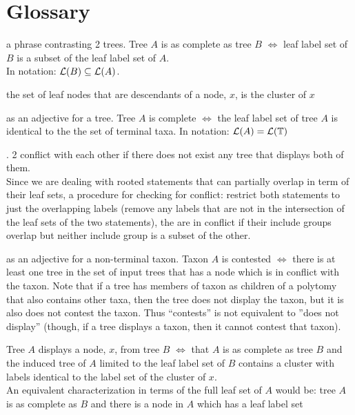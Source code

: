 \newcommand{\defitem}[2]{\item[{\bf #1}]\label{itm:#2} }
\newcommand{\notitem}[1]{\item[]#1}
\section{Glossary}
\begin{compactenum}
\defitem{as complete}{defAsComplete} a phrase contrasting 2 trees.
    Tree $A$ is as complete as tree $B$ $\iff$
    leaf label set of $B$ is a subset of the leaf label set of $A$.\\
    In notation: $\mathcal{L}(B) \subseteq \mathcal{L}(A)$.
\defitem{cluster}{defCluster} the set of leaf nodes that are descendants
    of a node, $x$, is the cluster of $x$
\defitem{complete}{defComplete} as an adjective for a tree. Tree $A$ is complete $\iff$ the leaf label set
    of tree $A$ is identical to the the set of terminal taxa.
    In notation: $\mathcal{L}(A) = \mathcal{L}(\mathbb{T})$
\defitem{conflicting}{defConflicting}. 2 \pss conflict with each other if there does not exist
    any tree that displays both of them.\\
    Since we are dealing with rooted statements that can partially overlap in term of their leaf sets, 
    a procedure for checking for conflict: restrict both statements to just the overlapping labels 
    (remove any labels that are not in the intersection of the leaf sets of the two statements), the
    \pss are in conflict if their include groups overlap but neither include group is a subset of the
    other.
\defitem{contested}{defContested} as an adjective for a non-terminal taxon. Taxon $A$ is contested $\iff$ 
    there is at least one tree in the set of input trees that has a node which is in conflict
    with the taxon.
    Note that if a tree has members of taxon as children of a polytomy that also contains other taxa, then
        the tree does not display the taxon, but it is also does not contest the taxon.
    Thus ``contests'' is not equivalent to ''does not display'' (though, if a tree displays a taxon, then 
        it cannot contest that taxon).
\defitem{display}{defDisplay} Tree $A$ displays a node, $x$, from tree $B$ $\iff$
    that $A$ is as complete as tree $B$ and the induced tree of $A$ limited to the 
    leaf label set of $B$ contains a cluster with labels identical to the label set of the cluster of $x$.\\
    An equivalent characterization in terms of the full leaf set of $A$ would be:
    tree $A$ is as complete as $B$ and there is a node in $A$ which has a leaf label set 

\end{compactenum}
